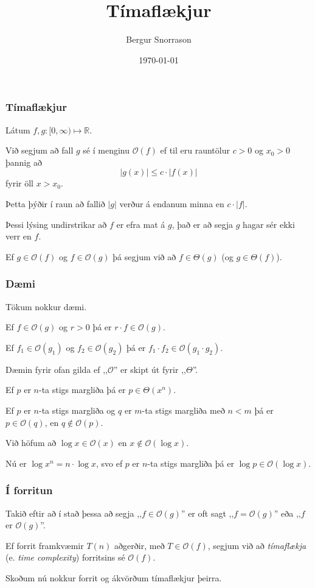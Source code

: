 \title{Tímaflækjur}
\author{Bergur Snorrason}
\date{\today}



\frame{\titlepage}

{
	\frametitle{Tímaflækjur}
	{
		\item<1-> Látum $f, g \colon [0, \infty) \mapsto \mathbb{R}$.
		\item<2-> Við segjum að fall $g$ sé í menginu $\mathcal{O}(f)$ ef til eru rauntölur $c > 0$ og $x_0 > 0$ þannig að
		\[
			|g(x)| \leq c \cdot |f(x)|
		\]
		fyrir öll $x > x_0$.
		\item<3-> Þetta þýðir í raun að fallið $|g|$ verður á endanum minna en $c \cdot |f|$.
		\item<4-> Þessi lýsing undirstrikar að $f$ er efra mat á $g$, það er að segja $g$ hagar sér ekki verr en $f$.
		\item<5-> Ef $g \in \mathcal{O}(f)$ og $f \in \mathcal{O}(g)$ þá segjum við að $f \in \Theta(g)$ (og $g \in \Theta(f)$).
	}
}

{
	\frametitle{Dæmi}
	{
		\item<1-> Tökum nokkur dæmi.
		\item<2-> Ef $f \in \mathcal{O}(g)$ og $r > 0$ þá er $r \cdot f \in \mathcal{O}(g)$.
		\item<3-> Ef $f_1 \in \mathcal{O}(g_1)$ og $f_2 \in \mathcal{O}(g_2)$ þá er $f_1 \cdot f_2 \in \mathcal{O}(g_1 \cdot g_2)$.
		\item<4-> Dæmin fyrir ofan gilda ef ,,$\mathcal{O}$'' er skipt út fyrir ,,$\Theta$''.
		\item<5-> Ef $p$ er $n$-ta stigs margliða þá er $p \in \Theta(x^n)$.
		\item<6-> Ef $p$ er $n$-ta stigs margliða og $q$ er $m$-ta stigs margliða með $n < m$ þá er $p \in \mathcal{O}(q)$,
					en $q \not \in \mathcal{O}(p)$.
		\item<7-> Við höfum að $\log x \in \mathcal{O}(x)$ en $x \not \in \mathcal{O}(\log x)$.
		\item<8-> Nú er $\log x^n = n \cdot \log x$, svo ef $p$ er $n$-ta stigs margliða þá er $\log p \in \mathcal{O}(\log x)$.
	}
}

{
	\frametitle{Í forritun}
	{
		\item<1-> Takið eftir að í stað þessa að segja ,,$f \in \mathcal{O}(g)$'' er oft sagt ,,$f = \mathcal{O}(g)$'' eða ,,$f$ er $\mathcal{O}(g)$''.
		\item<2-> Ef forrit framkvæmir $T(n)$ aðgerðir, með $T \in \mathcal{O}(f)$,
					segjum við að \emph{tímaflækja} (e. \emph{time complexity}) forritsins sé $\mathcal{O}(f)$.
		\item<3-> Skoðum nú nokkur forrit og ákvörðum tímaflækjur þeirra.
	}
}

